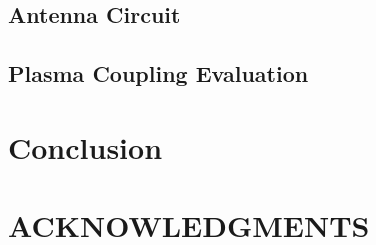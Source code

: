 \documentclass{aip-cp}
\begin{document}
\subsection{Antenna Circuit}

\subsection{Plasma Coupling Evaluation}

\section{Conclusion}


%
%
%
%
%
%





\section{ACKNOWLEDGMENTS}



\nocite{*}
%
%
\end{document}
